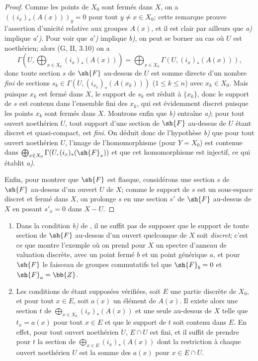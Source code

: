\begin{proof}
Comme les points de $X_0$ sont fermés dans $X$, on a $((i_x)_*(A(x)))_y=0$ pour tout $y\neq x\in X_0$;
cette remarque prouve l'assertion d'unicité relative aux groupes $A(x)$, et il est clair par ailleurs que \emph{a)} implique \emph{a$'$)}.
Pour voir que \emph{a$'$)} implique \emph{b)}, on peut se borner au cas où $U$ est noethérien;
alors (G, II, 3.10) on a
\[
  \Gamma(U,\bigoplus_{x\in X_0}(i_x)_*(A(x)))
  =\bigoplus_{x\in X_0}\Gamma(U,(i_x)_*(A(x))),
\]
donc toute section $s$ de $\sh{F}$ au-dessus de $U$ est somme directe d'un nombre \emph{fini} de sections $s_k\in\Gamma(U,(i_{x_k})_*(A(x_k)))$ ($1\leq k\leq n$) avec $x_k\in X_0$.
Mais puisque $x_k$ est fermé dans $X$, le support de $s_k$ est réduit à $\{x_k\}$, donc le support de $s$ est contenu dans l'ensemble fini des $x_k$, qui est évidemment discret puisque les points $x_k$ sont fermés dans $X$.
Montrons enfin que \emph{b)} entraîne \emph{a)};
pour tout ouvert noethérien $U$, tout support d'une section de $\sh{F}$ au-dessus de $U$ étant discret et quasi-compact, est \emph{fini}.
On déduit donc de l'hypothèse \emph{b)} que pour tout ouvert noethérien $U$, l'image de l'homomorphisme  (pour $Y=X_0$) est contenue dans $\bigoplus_{x\in X_0}\Gamma(U,(i_x)_*(\sh{F}_x))$ et que cet homomorphisme est injectif, ce qui établit \emph{a)}.

Enfin, pour montrer que $\sh{F}$ est flasque, considérons une section $s$ de $\sh{F}$ au-dessus d'un ouvert $U$ de $X$;
comme le support de $s$ est un sous-espace discret et fermé dans $X$, on prolonge $s$ en une section $s'$ de $\sh{F}$ au-dessus de $X$ en posant $s'_x=0$ dans $X-U$.
\end{proof}

\begin{remark}[21.9.3]
\label{IV.21.9.3}
\begin{enumerate}[label=(\roman*)]
  \item Dans la condition \emph{b)} de , il ne suffit pas de supposer que le support de toute section de $\sh{F}$ au-dessus d'un ouvert quelconque de $X$ soit \emph{discret};
c'est ce que montre l'exemple où on prend pour $X$ un spectre d'anneau de valuation discrète, avec un point fermé $b$ et un point générique $a$, et pour $\sh{F}$ le faisceau de groupes commutatifs tel que $\sh{F}_b=0$ et $\sh{F}_a=\bb{Z}$.

  \item Les conditions de  étant supposées vérifiées, soit $E$ une partie discrète de $X_0$, et pour tout $x\in E$, soit $a(x)$ un élément de $A(x)$.
Il existe alors une section $t$ de $\bigoplus_{x\in X_0}(i_x)_*(A(x))$ et une seule au-dessus de $X$ telle que $t_x=a(x)$ pour tout $x\in E$ et que le support de $t$ soit contenu dans $E$.
En effet, pour tout ouvert noethérien $U$, $E\cap U$ est fini, et il suffit de prendre pour $t$ la section de $\bigoplus_{x\in E}(i_x)_*(A(x))$ dont la restriction à chaque ouvert noethérien $U$ est la somme des $a(x)$ pour $x\in E\cap U$.
\end{enumerate}
\end{remark}

